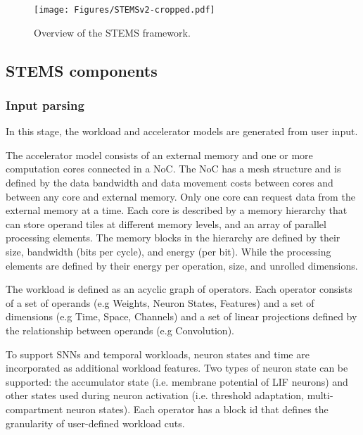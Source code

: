 \begin{figure}[t]
    \centering
    \texttt{[image: Figures/STEMSv2-cropped.pdf]}
    \caption{Overview of the STEMS framework.}

    \label{fig:stems}
\end{figure}

%



\subsection{STEMS components}


\subsubsection{Input parsing}

In this stage, the workload and accelerator models are generated from user input. 

The accelerator model consists of an external memory and one or more computation cores connected in a NoC. The NoC has a mesh structure and is defined by the data bandwidth and data movement costs between cores and between any core and external memory. Only one core can request data from the external memory at a time. Each core is described by a memory hierarchy that can store operand tiles at different memory levels, and an array of parallel processing elements. The memory blocks in the hierarchy are defined by their size, bandwidth (bits per cycle), and energy (per bit). While the processing elements are defined by their energy per operation, size, and unrolled dimensions.

The workload is defined as an acyclic graph of operators. Each operator consists of a set of operands (e.g Weights, Neuron States, Features) and a set of dimensions (e.g Time, Space, Channels) and a set of linear projections defined by the relationship between operands (e.g Convolution). 

To support SNNs and temporal workloads, neuron states and time are incorporated as additional workload features. Two types of neuron state can be supported: the accumulator state (i.e. membrane potential of LIF neurons) and other states used during neuron activation (i.e. threshold adaptation, multi-compartment neuron states). Each operator has a block id that defines the granularity of user-defined workload cuts.


